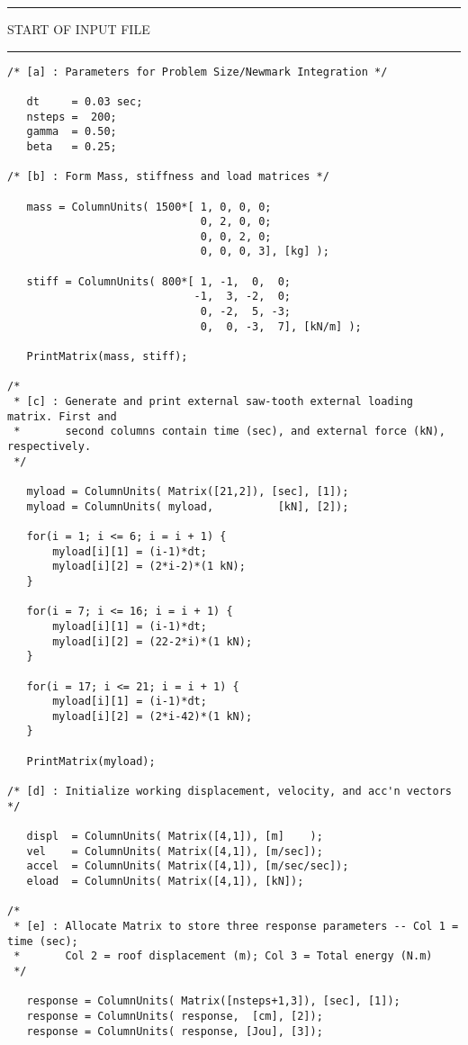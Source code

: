 \begin{footnotesize}
\vspace{0.20 in}
\noindent
{\rule{2.3 in}{0.035 in} START OF INPUT FILE \rule{2.3 in}{0.035 in} }
\begin{verbatim}
/* [a] : Parameters for Problem Size/Newmark Integration */

   dt     = 0.03 sec;
   nsteps =  200;
   gamma  = 0.50;
   beta   = 0.25;

/* [b] : Form Mass, stiffness and load matrices */

   mass = ColumnUnits( 1500*[ 1, 0, 0, 0;
                              0, 2, 0, 0;
                              0, 0, 2, 0;
                              0, 0, 0, 3], [kg] );

   stiff = ColumnUnits( 800*[ 1, -1,  0,  0;
                             -1,  3, -2,  0;
                              0, -2,  5, -3;
                              0,  0, -3,  7], [kN/m] );

   PrintMatrix(mass, stiff);

/* 
 * [c] : Generate and print external saw-tooth external loading matrix. First and
 *       second columns contain time (sec), and external force (kN), respectively.
 */ 

   myload = ColumnUnits( Matrix([21,2]), [sec], [1]);
   myload = ColumnUnits( myload,          [kN], [2]);

   for(i = 1; i <= 6; i = i + 1) {
       myload[i][1] = (i-1)*dt;
       myload[i][2] = (2*i-2)*(1 kN);
   }

   for(i = 7; i <= 16; i = i + 1) {
       myload[i][1] = (i-1)*dt;
       myload[i][2] = (22-2*i)*(1 kN);
   }

   for(i = 17; i <= 21; i = i + 1) {
       myload[i][1] = (i-1)*dt;
       myload[i][2] = (2*i-42)*(1 kN);
   }

   PrintMatrix(myload);

/* [d] : Initialize working displacement, velocity, and acc'n vectors */

   displ  = ColumnUnits( Matrix([4,1]), [m]    );
   vel    = ColumnUnits( Matrix([4,1]), [m/sec]);
   accel  = ColumnUnits( Matrix([4,1]), [m/sec/sec]);
   eload  = ColumnUnits( Matrix([4,1]), [kN]);

/* 
 * [e] : Allocate Matrix to store three response parameters -- Col 1 = time (sec);
 *       Col 2 = roof displacement (m); Col 3 = Total energy (N.m)
 */ 

   response = ColumnUnits( Matrix([nsteps+1,3]), [sec], [1]);
   response = ColumnUnits( response,  [cm], [2]);
   response = ColumnUnits( response, [Jou], [3]);


\end{verbatim}
\end{footnotesize}
